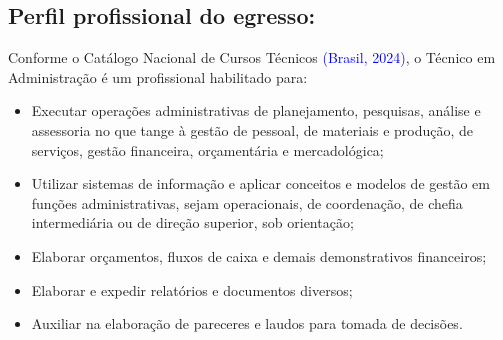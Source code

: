 \documentclass{../../modelos/latex-shared/ifsc-ppc}
\newcommand{\revisao}[1]{\textcolor{blue}{#1}}
\newcommand{\revisao}[1]{#1}
\begin{document}
\subsection{Perfil profissional do egresso:}
Conforme o Catálogo Nacional de Cursos Técnicos \revisao{(Brasil, 2024)}, o Técnico em Administração é um profissional habilitado para:
\begin{itemize}
    \item Executar operações administrativas de planejamento, pesquisas, análise e assessoria no que tange à gestão de pessoal, de materiais e produção, de serviços, gestão financeira, orçamentária e mercadológica;
    \item Utilizar sistemas de informação e aplicar conceitos e modelos de gestão em funções administrativas, sejam operacionais, de coordenação, de chefia intermediária ou de direção superior, sob orientação;
    \item Elaborar orçamentos, fluxos de caixa e demais demonstrativos financeiros;
    \item Elaborar e expedir relatórios e documentos diversos;
    \item Auxiliar na elaboração de pareceres e laudos para tomada de decisões.
\end{itemize}
\end{document}
